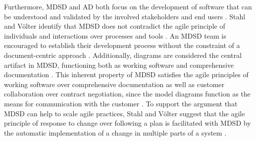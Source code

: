 \documentclass[fina_report_innit.tex]{subfiles}
\begin{document}
Furthermore, MDSD and AD both focus on the development of software that can be understood and validated by the involved stakeholders and end users \cite{stahl2006model}. Stahl and Völter identify that MDSD does not contradict the agile principle of individuals and interactions over processes and tools \cite{stahl2006model}. An MDSD team is encouraged to establish their development process without the constraint of a document-centric approach \cite{stahl2006model}. Additionally, diagrams are considered the central artifact in MDSD, functioning both as working software and comprehensive documentation \cite{stahl2006model}. This inherent property of MDSD satisfies the agile principles of working software over comprehensive documentation as well as customer collaboration over contract negotiation, since the model diagrams function as the means for communication with the customer \cite{stahl2006model}. To support the argument that MDSD can help to scale agile practices, Stahl and Völter suggest that the agile principle of response to change over following a plan is facilitated with MDSD by the automatic implementation of a change in multiple parts of a system \cite{stahl2006model}.
\end{document}
